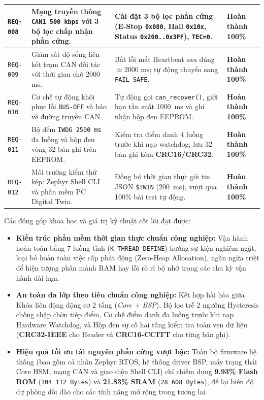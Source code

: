 \begin{xltabular}{\textwidth}{|C{1.7cm}|Y|Y|C{2.3cm}|}
\hline
{}
\texttt{REQ-008} & Mạng truyền thông \texttt{CAN1 500 kbps} với 3 bộ lọc chấp nhận phần cứng. & Cài đặt 3 bộ lọc phần cứng (E-Stop \texttt{0x080}, Hall \texttt{0x10x}, Status \texttt{0x200..0x3FF}), \texttt{TEC=0}. & \textbf{Hoàn thành 100\%} \\
\hline
\texttt{REQ-009} & Giám sát độ sống liên kết trạm CAN đối tác với thời gian chờ 2000 ms. & Bắt lỗi mất Heartbeat sau đúng $\approx 2000\text{ ms}$; tự động chuyển sang \texttt{FAIL\_SAFE}. & \textbf{Hoàn thành 100\%} \\
\hline
{}
\texttt{REQ-010} & Cơ chế tự động khôi phục lỗi \texttt{BUS-OFF} và bảo vệ đường truyền CAN. & Tự động gọi \texttt{can\_recover()}, giới hạn tần suất 1000~ms và ghi nhận hộp đen EEPROM. & \textbf{Hoàn thành 100\%} \\
\hline
\texttt{REQ-011} & Bộ đếm \texttt{IWDG 2500 ms} đa luồng và hộp đen vòng 32 bản ghi trên EEPROM. & Kiểm tra điểm danh 4 luồng trước khi nạp watchdog; lưu 32 bản ghi kèm \textbf{CRC16/CRC32}. & \textbf{Hoàn thành 100\%} \\
\hline
{}
\texttt{REQ-012} & Môi trường kiểm thử kép: Zephyr Shell CLI và phần mềm PC Digital Twin. & Đồng bộ thời gian thực gói tin JSON \texttt{\$TWIN} (200~ms), vượt qua 100\% bài test tự động. & \textbf{Hoàn thành 100\%} \\
\hline
\end{xltabular}
\endgroup

Các đóng góp khoa học và giá trị kỹ thuật cốt lõi đạt được:
\begin{itemize}[nosep]
    \item \textbf{Kiến trúc phần mềm thời gian thực chuẩn công nghiệp:} Vận hành hoàn toàn bằng 7 luồng tĩnh (\texttt{K\_THREAD\_DEFINE}) hướng sự kiện nghiêm ngặt, loại bỏ hoàn toàn việc cấp phát động (Zero-Heap Allocation), ngăn ngừa triệt để hiện tượng phân mảnh RAM hay lỗi rò rỉ bộ nhớ trong các chu kỳ vận hành dài hạn.
    \item \textbf{An toàn đa lớp theo tiêu chuẩn công nghiệp:} Kết hợp hài hòa giữa Khóa liên động động cơ 2 tầng (\textit{Core + BSP}), Bộ lọc trễ 2 ngưỡng Hysteresis chống chập chờn tiếp điểm, Cơ chế điểm danh đa luồng trước khi nạp Hardware Watchdog, và Hộp đen sự cố hai tầng kiểm tra toàn vẹn dữ liệu (\textbf{CRC32-IEEE} cho Header và \textbf{CRC16-CCITT} cho từng bản ghi).
    \item \textbf{Hiệu quả tối ưu tài nguyên phần cứng vượt bậc:} Toàn bộ firmware hệ thống (bao gồm cả nhân Zephyr RTOS, hệ thống driver BSP, máy trạng thái Core HSM, mạng CAN và giao diện Shell CLI) chỉ chiếm dụng \textbf{9.93\% Flash ROM} (\texttt{104\,112 Bytes}) và \textbf{21.83\% SRAM} (\texttt{28\,608 Bytes}), để lại biên độ dự phòng dồi dào cho các tính năng mở rộng trong tương lai.
\end{itemize}


